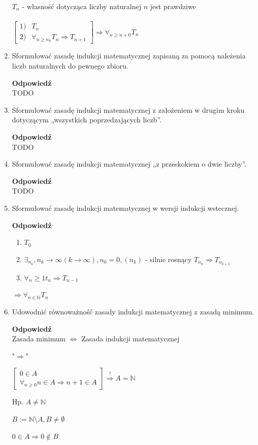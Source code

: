 \documentclass[12pt,a4paper]{article}
\theoremstyle{break}
\newcommand{\Odp}[1]{
		\begin{mdframed}[style=zadanie]
			\textbf{Odpowiedź}\\
			#1
		\end{mdframed}
	}
\begin{document}
\begin{enumerate}[1.]
{		$T_n$ - własność dotycząca liczby naturalnej $n$ jest prawdziwe\\\\
		
		$\begin{bmatrix}
			1) & T_n\\
			2) & \forall_{n\geq n_0} T_n\Rightarrow T_{n+1}
		\end{bmatrix} \Rightarrow \forall_{n\geq n+0} T_n$
	}
	
	\item Sformułować zasadę indukcji matematycznej zapisaną za pomocą należenia liczb naturalnych do pewnego zbioru.
	\Odp{
		TODO
	}
	
	\item Sformułować zasadę indukcji matematycznej z założeniem w drugim kroku dotyczącym „wszystkich poprzedzających liczb”.
	\Odp{
		TODO
	}
	
	\item Sformułować zasadę indukcji matematycznej „z przeskokiem o dwie liczby”.
	\Odp{
		TODO
	}
	
	\item Sformułować zasadę indukcji matematycznej w wersji indukcji wstecznej.
	\Odp{
		\begin{enumerate}[1)]
			\item $T_0$
			\item $\exists_{n_k}, n_k \rightarrow \infty (k\rightarrow \infty), n_0 = 0, (n_k)$ - silnie rosnący $T_{n_k} \Rightarrow T_{n_{k+1}}$
			\item $ \forall_n\geq 1 t_n \Rightarrow T_{n-1}$
		\end{enumerate}
	
		$\Rightarrow \forall_{n\in\mathbb{N}} T_n$
	}
	
	\item Udowodnić równoważność zasady indukcji matematycznej z zasadą minimum.
	\Odp{
		Zasada minimum $\Leftrightarrow$ Zasada indukcji matematycznej
		
		"$\Rightarrow$"
		
		$\begin{bmatrix}
			0\in A\\
			\forall_{n\geq 0} n\in A \Rightarrow n+1\in A
		\end{bmatrix} \overset{?}{\Rightarrow} A=\mathbb{N} $
	
		Hp. $A\neq \mathbb{N}$
		
		$B:= \mathbb{N}\setminus A, B\neq \emptyset$
		
		$0\in A \Rightarrow 0\notin B$
		
}
\end{enumerate}
\end{document}
